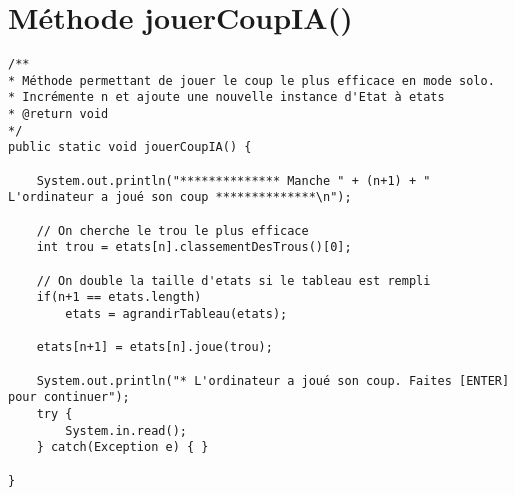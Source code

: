 \documentclass[11pt,a4paper]{report}
\begin{document}
    \section{Méthode jouerCoupIA()}
        \begin{lstlisting}
/**
* Méthode permettant de jouer le coup le plus efficace en mode solo.
* Incrémente n et ajoute une nouvelle instance d'Etat à etats
* @return void
*/
public static void jouerCoupIA() {

    System.out.println("************** Manche " + (n+1) + " L'ordinateur a joué son coup **************\n");

    // On cherche le trou le plus efficace
    int trou = etats[n].classementDesTrous()[0];

    // On double la taille d'etats si le tableau est rempli
    if(n+1 == etats.length)
        etats = agrandirTableau(etats);

    etats[n+1] = etats[n].joue(trou);

    System.out.println("* L'ordinateur a joué son coup. Faites [ENTER] pour continuer");
    try {
        System.in.read();
    } catch(Exception e) { }

}
        \end{lstlisting}

        \newpage
\end{document}

